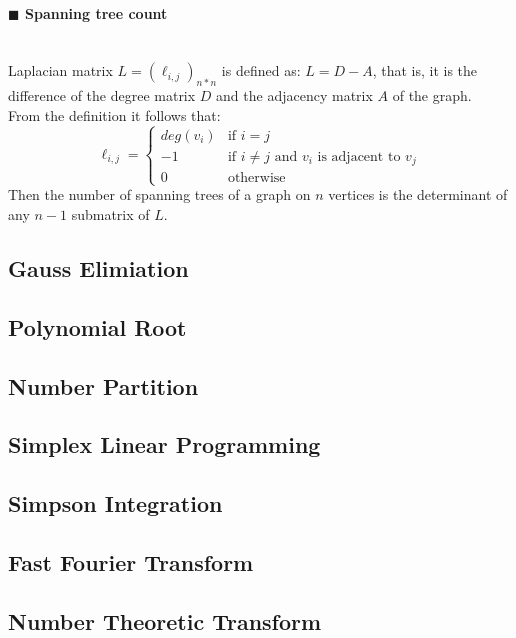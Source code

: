 \documentclass[10pt]{article}
\begin{document}
\paragraph{$\blacksquare$ Spanning tree count}
\noindent \\
Laplacian matrix $L=(\ell_{i,j})_{n*n}$ is defined as: $L=D-A$, that is, it is the difference of the degree matrix $D$ and the adjacency matrix $A$ of the graph. \\
From the definition it follows that:
\begin{displaymath}
\ell_{i,j}=
\left\{ \begin{array}{ll}
deg(v_i) & \textrm{if } i=j \\
-1 & \textrm{if }i\ne j\textrm{ and }v_i\textrm{ is adjacent to }v_j \\
0 & \textrm{otherwise}
\end{array} \right.
\end{displaymath}
Then the number of spanning trees of a graph on $n$ vertices is the determinant of any $n-1$ submatrix of $L$.
\subsection{Gauss Elimiation}

\subsection{Polynomial Root}

\subsection{Number Partition}

\subsection{Simplex Linear Programming}

\subsection{Simpson Integration}

\subsection{Fast Fourier Transform}

\subsection{Number Theoretic Transform}

\end{document}
